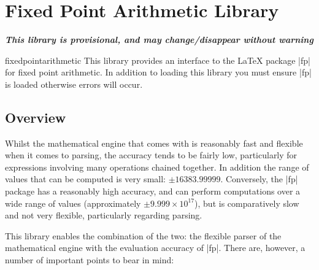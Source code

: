 %
%
%


\section{Fixed Point Arithmetic Library}

{\bf\emph{This library is provisional, and may change/disappear without warning}}

\begin{pgflibrary}{fixedpointarithmetic}
  This library provides an interface to the \LaTeX{} package
  |fp| for fixed point arithmetic. 	In addition to loading this
  library you must ensure |fp| is loaded otherwise errors
  will occur.
\end{pgflibrary}

\subsection{Overview}

  Whilst the mathematical engine that comes with \pgfname{} is
  reasonably fast and flexible when it comes to parsing, the accuracy
  tends to be fairly low, particularly for expressions involving many
  operations chained together. In addition the range of values that
  can be computed is very small: $\pm16383.99999$.
	Conversely, the |fp| package has a reasonably high accuracy, and
	can	perform computations over a wide range of
	values (approximately $\pm9.999\times10^{17}$), but is comparatively
	slow and not very
	flexible, particularly regarding parsing.

  This library enables the combination of the two: the flexible parser
  of the \pgfname{} mathematical engine with the evaluation accuracy
  of |fp|. There are, however, a number of important points to
  bear in mind:

